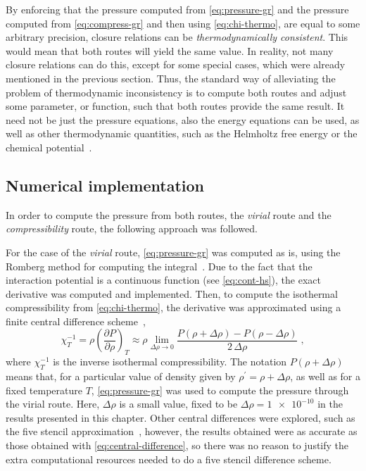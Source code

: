 By enforcing that the pressure computed from \autoref{eq:pressure-gr} and the pressure 
computed from \autoref{eq:compress-gr} and then using \autoref{eq:chi-thermo}, are equal to 
some arbitrary precision, closure relations can be \emph{thermodynamically consistent}. 
This would mean that both routes will yield the same value. In reality, not many closure 
relations can do this, except for some special cases, which were already mentioned in the 
previous section. Thus, the standard way of alleviating the problem of thermodynamic 
inconsistency is to compute both routes and adjust some parameter, or function, 
such that both routes provide the same result. It need not be just the pressure equations, 
also the energy equations can be used, as well as other thermodynamic quantities, such as 
the Helmholtz free energy or the chemical 
potential~\cite{tsedneeClosureOrnsteinZernikeEquation2019}.

\subsection{Numerical implementation}
In order to compute the pressure from both routes, the \emph{virial} route and the \emph{compressibility} route, the following approach was followed.

For the case of the \emph{virial} route, \autoref{eq:pressure-gr} was computed as is, using 
the Romberg method for computing the integral~\cite{hammingNumericalMethodsScientists2012}. 
Due to the fact that the interaction potential is a continuous function (see 
\autoref{eq:cont-hs}), the exact derivative was computed and implemented. Then, to compute 
the isothermal compressibility from \autoref{eq:chi-thermo}, the derivative was 
approximated using a finite central difference 
scheme~\cite{hammingNumericalMethodsScientists2012},
\begin{equation}
    \chi_{T}^{-1} = \rho { \left( \frac{\partial P}{\partial \rho} \right) }_{T}
    \approx \rho \lim_{\Delta \rho \to 0} \frac{P(\rho + \Delta \rho) - P(\rho - \Delta \rho)}{2 \, \Delta \rho}
    \; ,
    \label{eq:central-difference}
\end{equation}
where \(\chi_{T}^{-1}\) is the inverse isothermal compressibility. The notation 
\(P(\rho + \Delta \rho)\) means that, for a particular value of density given by 
\(\rho^{\prime}=\rho + \Delta \rho\), as well as for a fixed temperature \(T\), 
\autoref{eq:pressure-gr} was used to compute the 
pressure through the virial route. Here, \(\Delta \rho\) is a small value, fixed to be
\(\Delta \rho=\num{1e-10}\) in the results presented in this chapter. Other central 
differences were explored, such as the five stencil 
approximation~\cite{hammingNumericalMethodsScientists2012}, however, the results obtained 
were as accurate as those obtained with \autoref{eq:central-difference}, so there was no 
reason to justify the extra computational resources needed to do a five stencil difference 
scheme.

